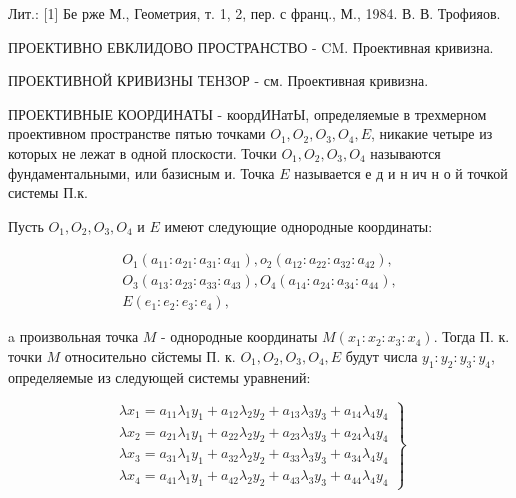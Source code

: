 \documentclass[10pt]{article}
\begin{document}
Лит.: [1] Бе рже М., Геометрия, т. 1, 2, пер. с франц., М., 1984. В. В. Трофияов.



ПРОЕКТИВНО ЕВКЛИДОВО ПРОСТРАНСТВО - $\mathrm{CM}$. Проективная кривизна.



ПРОЕКТИВНОЙ КРИВИЗНЫ ТЕНЗОР - см. Проективная кривизна.



ПРОЕКТИВНЫЕ КООРДИНАТЫ - коордИНатЫ, определяемые в трехмерном проективном пространстве пятью точками $O_{1}, O_{2}, O_{3}, O_{4}, E$, никакие четыре из которых не лежат в одной плоскости. Точки $O_{1}, O_{2}, O_{3}, O_{4}$ называются фундаментальными, или базисным и. Точка $E$ называется е д и н ич н о й точкой системы П.к.



Пусть $O_{1}, O_{2}, O_{3}, O_{4}$ и $E$ имеют следующие однородные координаты:



\[

\begin{gathered}

O_{1}\left(a_{11}: a_{21}: a_{31}: a_{41}\right), o_{2}\left(a_{12}: a_{22}: a_{32}: a_{42}\right), \\

O_{3}\left(a_{13}: a_{23}: a_{33}: a_{43}\right), O_{4}\left(a_{14}: a_{24}: a_{34}: a_{44}\right), \\

E\left(e_{1}: e_{2}: e_{3}: e_{4}\right),

\end{gathered}

\]



a произвольная точка $M$ - однородные координаты $M\left(x_{1}: x_{2}: x_{3}: x_{4}\right)$. Тогда П. к. точки $M$ относительно сйстемы П. к. $O_{1}, O_{2}, O_{3}, O_{4}, E$ будут числа $y_{1}: y_{2}: y_{3}: y_{4}$, определяемые из следующей системы уравнений:



\[

\left.\begin{array}{l}

\lambda x_{1}=a_{11} \lambda_{1} y_{1}+a_{12} \lambda_{2} y_{2}+a_{13} \lambda_{3} y_{3}+a_{14} \lambda_{4} y_{4} \\

\lambda x_{2}=a_{21} \lambda_{1} y_{1}+a_{22} \lambda_{2} y_{2}+a_{23} \lambda_{3} y_{3}+a_{24} \lambda_{4} y_{4} \\

\lambda x_{3}=a_{31} \lambda_{1} y_{1}+a_{32} \lambda_{2} y_{2}+a_{33} \lambda_{3} y_{3}+a_{34} \lambda_{4} y_{4} \\

\lambda x_{4}=a_{41} \lambda_{1} y_{1}+a_{42} \lambda_{2} y_{2}+a_{43} \lambda_{3} y_{3}+a_{44} \lambda_{4} y_{4}

\end{array}\right\}

\]
\end{document}

